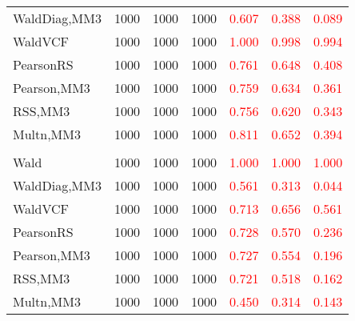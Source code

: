 \documentclass[
]{article}
\begin{document}
\begin{table}[H]
{\begin{tabular}[t]{lrrrrrr}
\hspace{1em}WaldDiag,MM3 & 1000 & 1000 & 1000 & \textcolor{red}{0.607} & \textcolor{red}{0.388} & \textcolor{red}{0.089}\\
\hspace{1em}WaldVCF & 1000 & 1000 & 1000 & \textcolor{red}{1.000} & \textcolor{red}{0.998} & \textcolor{red}{0.994}\\
\hspace{1em}PearsonRS & 1000 & 1000 & 1000 & \textcolor{red}{0.761} & \textcolor{red}{0.648} & \textcolor{red}{0.408}\\
\hspace{1em}Pearson,MM3 & 1000 & 1000 & 1000 & \textcolor{red}{0.759} & \textcolor{red}{0.634} & \textcolor{red}{0.361}\\
\hspace{1em}RSS,MM3 & 1000 & 1000 & 1000 & \textcolor{red}{0.756} & \textcolor{red}{0.620} & \textcolor{red}{0.343}\\
\hspace{1em}Multn,MM3 & 1000 & 1000 & 1000 & \textcolor{red}{0.811} & \textcolor{red}{0.652} & \textcolor{red}{0.394}\\
\addlinespace[0.3em]
\multicolumn{7}{l}{\textbf{3F 15V}}\\
\hspace{1em}Wald & 1000 & 1000 & 1000 & \textcolor{red}{1.000} & \textcolor{red}{1.000} & \textcolor{red}{1.000}\\
\hspace{1em}WaldDiag,MM3 & 1000 & 1000 & 1000 & \textcolor{red}{0.561} & \textcolor{red}{0.313} & \textcolor{red}{0.044}\\
\hspace{1em}WaldVCF & 1000 & 1000 & 1000 & \textcolor{red}{0.713} & \textcolor{red}{0.656} & \textcolor{red}{0.561}\\
\hspace{1em}PearsonRS & 1000 & 1000 & 1000 & \textcolor{red}{0.728} & \textcolor{red}{0.570} & \textcolor{red}{0.236}\\
\hspace{1em}Pearson,MM3 & 1000 & 1000 & 1000 & \textcolor{red}{0.727} & \textcolor{red}{0.554} & \textcolor{red}{0.196}\\
\hspace{1em}RSS,MM3 & 1000 & 1000 & 1000 & \textcolor{red}{0.721} & \textcolor{red}{0.518} & \textcolor{red}{0.162}\\
\hspace{1em}Multn,MM3 & 1000 & 1000 & 1000 & \textcolor{red}{0.450} & \textcolor{red}{0.314} & \textcolor{red}{0.143}\\
\bottomrule
\end{tabular}}
\endgroup{}
\end{table}
\end{document}

